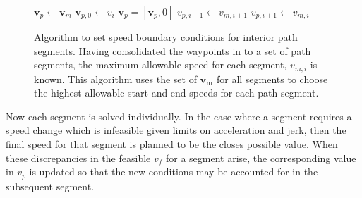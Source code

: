 \documentclass[letterpaper, 10 pt, conference]{ieeeconf}  %
\begin{document}
\begin{figure}
  \begin{algorithmic}[1]
      \State $\mathbf{v}_p \gets \mathbf{v}_m$ 
      \State $\mathbf{v}_{p,0} \gets v_i$ 
      \State $\mathbf{v}_p = [\mathbf{v}_p, 0]$ 
          \State $v_{p,i+1} \gets v_{m,i+1}$
        \Else
          \State $v_{p,i+1} \gets v_{m,i}$
        \EndIf
      \EndFor
    \EndProcedure
  \end{algorithmic}
  \caption{
    Algorithm to set speed boundary conditions for interior path segments.
    Having consolidated the waypoints in to a set of path segments, the maximum allowable speed for each segment, $v_{m,i}$ is known.
    This algorithm uses the set of $\mathbf{v_{m}}$ for all segments to choose the highest allowable start and end speeds for each path segment.
  }
\label{alg:segmentspeedboundaryconditions}
\end{figure}

Now each segment is solved individually.
In the case where a segment requires a speed change which is infeasible given limits on acceleration and jerk, then the final speed for that segment is planned to be the closes possible value.
When these discrepancies in the feasible $v_f$ for a segment arise, the corresponding value in $v_p$ is updated so that the new conditions may be accounted for in the subsequent segment.
\end{document}
